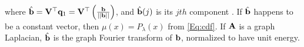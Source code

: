 \documentclass{article}
\begin{document}
where $\hat{\bf b}={\bf V}^{\top}{\bf q}_1={\bf V}^{\top}\left(\frac{{\bf b}}{||{\bf b}||}\right)$, and $\hat{\bf b}(j)$ is its $jth$ component \cite[Theorem 4.2]{golub2009matrices}. If %
$\hat{\bf b}$ happens to be a constant vector, then $\mu(x)=P_{\lambda}(x)$ from \eqref{Eq:cdf}. %
If ${\bf A}$ is a graph Laplacian, $\hat{\bf b}$ is the graph Fourier transform \cite{shuman2013emerging} of ${\bf b}$, normalized to have unit energy.

\end{document}
